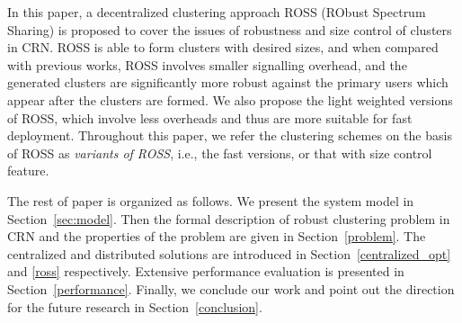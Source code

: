 \documentclass[10pt,journal,compsoc]{IEEEtran}
\theoremstyle{mytheoremstyle}
\theoremstyle{mytheoremstyle}
\theoremstyle{mytheoremstyle}
\newcommand{\ie}{i.e., }
\begin{document}
In this paper, a decentralized clustering approach ROSS (RObust Spectrum Sharing) is proposed to cover the issues of robustness and size control of clusters in CRN.
ROSS is able to form clusters with desired sizes, and when compared with previous works, ROSS involves smaller signalling overhead, and the generated clusters are significantly more robust against the primary users which appear after the clusters are formed.
%
We also propose the light weighted versions of ROSS, which involve less overheads and thus are more suitable for fast deployment.
Throughout this paper, we refer the clustering schemes on the basis of ROSS as \textit{variants of ROSS}, \ie the fast versions, or that with size control feature.

The rest of paper is organized as follows. 
We present the system model in Section~\ref{sec:model}. 
Then the formal description of robust clustering problem in CRN and the properties of the problem are given in Section~\ref{problem}.
The centralized and distributed solutions are introduced in Section~\ref{centralized_opt} and \ref{ross} respectively.
Extensive performance evaluation is presented in Section~\ref{performance}.
Finally, we conclude our work and point out the direction for the future research in Section~\ref{conclusion}.
\end{document}
